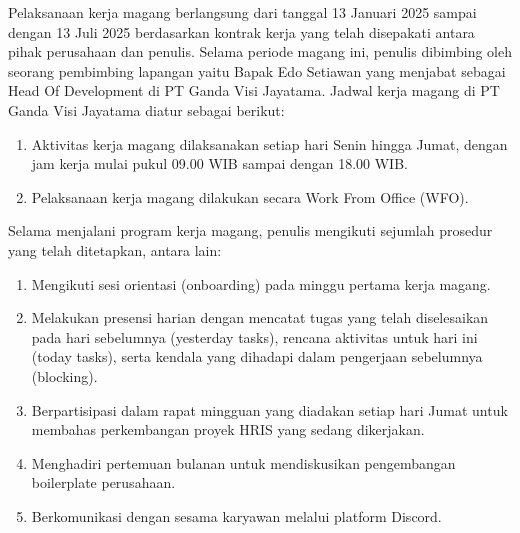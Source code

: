 Pelaksanaan kerja magang berlangsung dari tanggal 13 Januari 2025 sampai dengan 
13 Juli 2025 berdasarkan kontrak kerja yang telah disepakati antara pihak 
perusahaan dan penulis. Selama periode magang ini, penulis dibimbing oleh 
seorang pembimbing lapangan yaitu Bapak Edo Setiawan yang 
menjabat sebagai Head Of Development di PT Ganda Visi Jayatama. Jadwal 
kerja magang di PT Ganda Visi Jayatama diatur sebagai berikut:

\begin{enumerate}
    \item Aktivitas kerja magang dilaksanakan setiap hari Senin hingga Jumat, 
    dengan jam kerja mulai pukul 09.00 WIB sampai dengan 18.00 WIB.
    \item Pelaksanaan kerja magang dilakukan secara Work From Office (WFO).
\end{enumerate}

Selama menjalani program kerja magang, penulis mengikuti sejumlah prosedur 
yang telah ditetapkan, antara lain:

\begin{enumerate}
    \item Mengikuti sesi orientasi (onboarding) pada minggu pertama kerja magang.
    \item Melakukan presensi harian dengan mencatat tugas yang telah diselesaikan 
    pada hari sebelumnya (yesterday tasks), rencana aktivitas untuk hari ini 
    (today tasks), serta kendala yang dihadapi dalam pengerjaan sebelumnya (blocking).
    \item Berpartisipasi dalam rapat mingguan yang diadakan setiap hari Jumat 
    untuk membahas perkembangan proyek HRIS yang sedang dikerjakan.
    \item Menghadiri pertemuan bulanan untuk mendiskusikan pengembangan 
    boilerplate perusahaan.
    \item Berkomunikasi dengan sesama karyawan melalui platform Discord.
\end{enumerate}

